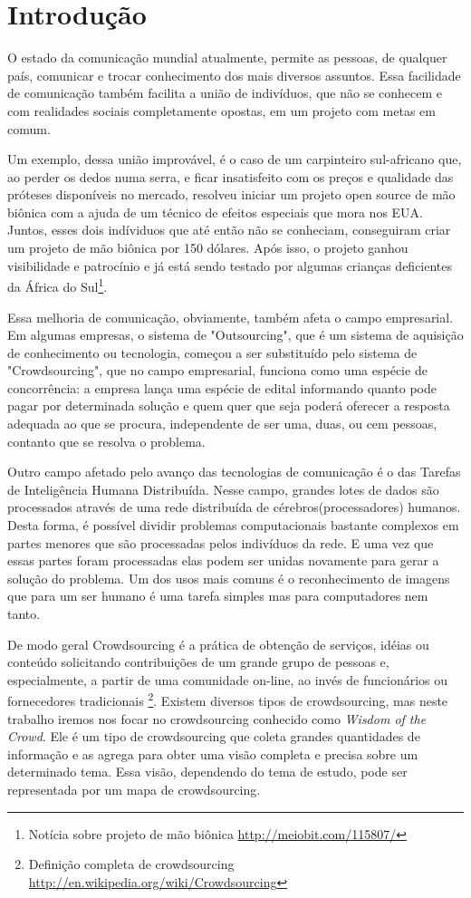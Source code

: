 \chapter{Introdução}

O estado  da comunicação mundial atualmente, permite as pessoas, de qualquer país, comunicar e trocar conhecimento dos mais diversos assuntos. Essa facilidade de comunicação também facilita a união de indivíduos, que não se conhecem e com realidades sociais completamente opostas, em um projeto com metas em comum.

Um exemplo, dessa união improvável, é o caso de um carpinteiro sul-africano que, ao perder os dedos numa serra, e ficar insatisfeito com os preços e qualidade das próteses disponíveis no mercado, resolveu iniciar um projeto open source de mão biônica com a ajuda de um técnico de efeitos especiais que mora nos EUA. Juntos, esses dois indíviduos que até então não se conheciam, conseguiram criar um projeto de mão biônica por 150 dólares. Após isso, o projeto ganhou visibilidade e patrocínio e já está sendo testado por algumas crianças deficientes da África do Sul\footnote{\label{maobionica} Notícia sobre projeto de mão biônica \url{http://meiobit.com/115807/}}.

Essa melhoria de comunicação, obviamente, também  afeta o campo empresarial. Em algumas empresas, o sistema de "Outsourcing", que é um sistema de aquisição de conhecimento ou tecnologia, começou a ser substituído pelo sistema de "Crowdsourcing", que no campo empresarial, funciona como uma espécie de concorrência: a empresa lança uma espécie de edital informando quanto pode pagar por determinada solução e quem quer que seja poderá oferecer a resposta adequada ao que se procura, independente de ser uma, duas, ou cem pessoas, contanto que se resolva o problema.

Outro campo afetado pelo avanço das tecnologias de comunicação é o das Tarefas de Inteligência Humana Distribuída. Nesse campo, grandes lotes de dados são processados através de uma rede distribuída de cérebros(processadores) humanos. Desta forma, é possível dividir problemas computacionais bastante complexos em partes menores que são processadas pelos indivíduos da rede. E uma vez que essas partes foram processadas elas podem ser unidas novamente para gerar a solução do problema. Um dos usos mais comuns é o reconhecimento de imagens que para um ser humano é uma tarefa simples mas para computadores nem tanto.

De modo geral Crowdsourcing é a prática de obtenção de serviços, idéias ou conteúdo solicitando contribuições de um grande grupo de pessoas e, especialmente, a partir de uma comunidade on-line, ao invés de funcionários ou fornecedores tradicionais \footnote{\label{wiki-crowd} Definição completa de crowdsourcing \url{ http://en.wikipedia.org/wiki/Crowdsourcing}}.
Existem diversos tipos de crowdsourcing, mas neste trabalho iremos nos focar no crowdsourcing conhecido como \emph{Wisdom of the Crowd}. Ele é um tipo de crowdsourcing que coleta grandes quantidades de informação e as agrega para obter uma visão completa e precisa sobre um determinado tema. Essa visão, dependendo do tema de estudo, pode ser representada por um mapa de crowdsourcing.

